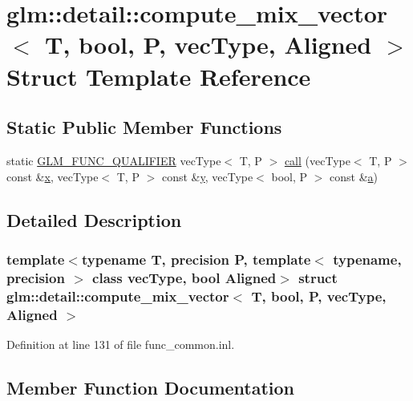 \hypertarget{structglm_1_1detail_1_1compute__mix__vector_3_01_t_00_01bool_00_01_p_00_01vec_type_00_01_aligned_01_4}{}\section{glm\+::detail\+::compute\+\_\+mix\+\_\+vector$<$ T, bool, P, vec\+Type, Aligned $>$ Struct Template Reference}
\label{structglm_1_1detail_1_1compute__mix__vector_3_01_t_00_01bool_00_01_p_00_01vec_type_00_01_aligned_01_4}
\subsection*{Static Public Member Functions}
\begin{DoxyCompactItemize}
\item 
static \mbox{\hyperlink{setup_8hpp_a33fdea6f91c5f834105f7415e2a64407}{G\+L\+M\+\_\+\+F\+U\+N\+C\+\_\+\+Q\+U\+A\+L\+I\+F\+I\+ER}} vec\+Type$<$ T, P $>$ \mbox{\hyperlink{structglm_1_1detail_1_1compute__mix__vector_3_01_t_00_01bool_00_01_p_00_01vec_type_00_01_aligned_01_4_a0db7a91dcc65f5bcca16a354a8ba7c48}{call}} (vec\+Type$<$ T, P $>$ const \&\mbox{\hyperlink{glad_8h_a92d0386e5c19fb81ea88c9f99644ab1d}{x}}, vec\+Type$<$ T, P $>$ const \&\mbox{\hyperlink{glad_8h_a66ddd433d2cacfe27f5906b7e86faeed}{y}}, vec\+Type$<$ bool, P $>$ const \&\mbox{\hyperlink{glad_8h_ac8729153468b5dcf13f971b21d84d4e5}{a}})
\end{DoxyCompactItemize}


\subsection{Detailed Description}
\subsubsection*{template$<$typename T, precision P, template$<$ typename, precision $>$ class vec\+Type, bool Aligned$>$\newline
struct glm\+::detail\+::compute\+\_\+mix\+\_\+vector$<$ T, bool, P, vec\+Type, Aligned $>$}



Definition at line 131 of file func\+\_\+common.\+inl.



\subsection{Member Function Documentation}
\mbox{\label{structglm_1_1detail_1_1compute__mix__vector_3_01_t_00_01bool_00_01_p_00_01vec_type_00_01_aligned_01_4_a0db7a91dcc65f5bcca16a354a8ba7c48}} 
